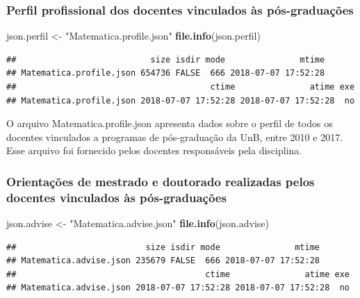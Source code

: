 \documentclass[]{article}
\newenvironment{Shaded}{\begin{snugshade}}{\end{snugshade}}
\newcommand{\KeywordTok}[1]{\textcolor[rgb]{0.13,0.29,0.53}{\textbf{#1}}}
\newcommand{\StringTok}[1]{\textcolor[rgb]{0.31,0.60,0.02}{#1}}
\newcommand{\NormalTok}[1]{#1}
\begin{document}
\subsubsection{Perfil profissional dos docentes vinculados às
pós-graduações}\label{perfil-profissional-dos-docentes-vinculados-as-pos-graduacoes}

\begin{Shaded}
\begin{Highlighting}[]
\NormalTok{json.perfil <-}\StringTok{ "Matematica.profile.json"}
\KeywordTok{file.info}\NormalTok{(json.perfil)}
\end{Highlighting}
\end{Shaded}

\begin{verbatim}
##                           size isdir mode               mtime
## Matematica.profile.json 654736 FALSE  666 2018-07-07 17:52:28
##                                       ctime               atime exe
## Matematica.profile.json 2018-07-07 17:52:28 2018-07-07 17:52:28  no
\end{verbatim}

O arquivo Matematica.profile.json apresenta dados sobre o perfil de
todos os docentes vinculados a programas de pós-graduação da UnB, entre
2010 e 2017. Esse arquivo foi fornecido pelos docentes responsáveis pela
disciplina.

\subsubsection{Orientações de mestrado e doutorado realizadas pelos
docentes vinculados às
pós-graduações}\label{orientacoes-de-mestrado-e-doutorado-realizadas-pelos-docentes-vinculados-as-pos-graduacoes}

\begin{Shaded}
\begin{Highlighting}[]
\NormalTok{json.advise <-}\StringTok{ "Matematica.advise.json"}
\KeywordTok{file.info}\NormalTok{(json.advise)}
\end{Highlighting}
\end{Shaded}

\begin{verbatim}
##                          size isdir mode               mtime
## Matematica.advise.json 235679 FALSE  666 2018-07-07 17:52:28
##                                      ctime               atime exe
## Matematica.advise.json 2018-07-07 17:52:28 2018-07-07 17:52:28  no
\end{verbatim}
\end{document}

